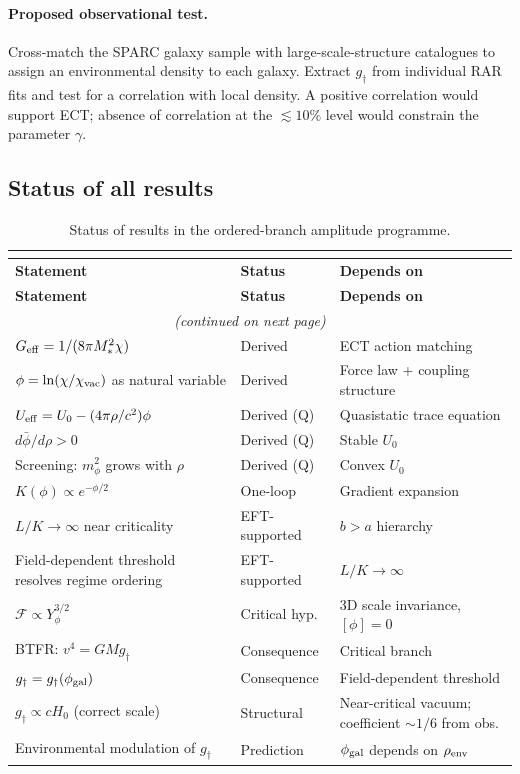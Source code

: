 \documentclass[11pt,a4paper]{article}
\numberwithin{equation}{section}
\begin{document}
\paragraph{Proposed observational test.}
Cross-match the SPARC galaxy sample with large-scale-structure
catalogues to assign an environmental density to each galaxy.
Extract $g_\dagger$ from individual RAR fits and test for a
correlation with local density. A positive correlation would
support ECT; absence of correlation at the $\lesssim\!10\%$
level would constrain the parameter $\gamma$.


\subsection{Status of all results}
\label{app:lof:status_table}

\begin{longtable}{p{5.5cm}p{2.5cm}p{5.5cm}}
\caption{Status of results in the ordered-branch amplitude programme.} \\
\label{tab:lof_status} \\[-6pt]
\toprule
\textbf{Statement} & \textbf{Status} & \textbf{Depends on} \\
\midrule
\endfirsthead
\toprule
\textbf{Statement} & \textbf{Status} & \textbf{Depends on} \\
\midrule
\endhead
\midrule\multicolumn{2}{r}{\small\textit{(continued on next page)}}\\
\endfoot
\bottomrule
\endlastfoot
$G_{\rm eff} = 1/(8\pi M_*^2\chi)$ & Derived & ECT action matching \\
$\phi = \ln(\chi/\chi_{\rm vac})$ as natural variable & Derived &
  Force law + coupling structure \\
$U_{\rm eff} = U_0 - (4\pi\rho/c^2)\phi$ & Derived (Q) &
  Quasistatic trace equation \\
$d\bar\phi/d\rho > 0$ & Derived (Q) & Stable $U_0$ \\
Screening: $m_\phi^2$ grows with $\rho$ & Derived (Q) &
  Convex $U_0$ \\
$K(\phi) \propto e^{-\phi/2}$ & One-loop &
  Gradient expansion \\
$L/K \to \infty$ near criticality & EFT-supported &
  $b > a$ hierarchy \\
Field-dependent threshold resolves regime ordering &
  EFT-supported & $L/K \to \infty$ \\
$\mathcal{F} \propto Y_\phi^{3/2}$ & Critical hyp. &
  3D scale invariance, $[\phi] = 0$ \\
BTFR: $v^4 = GMg_\dagger$ & Consequence & Critical branch \\
$g_\dagger = g_\dagger(\phi_{\rm gal})$ & Consequence &
  Field-dependent threshold \\
$g_\dagger \propto cH_0$ (correct scale) & Structural &
  Near-critical vacuum; coefficient $\sim\!1/6$ from obs. \\
Environmental modulation of $g_\dagger$ & Prediction &
  $\phi_{\rm gal}$ depends on $\rho_{\rm env}$ \\
\hline

\end{longtable}
\end{document}
